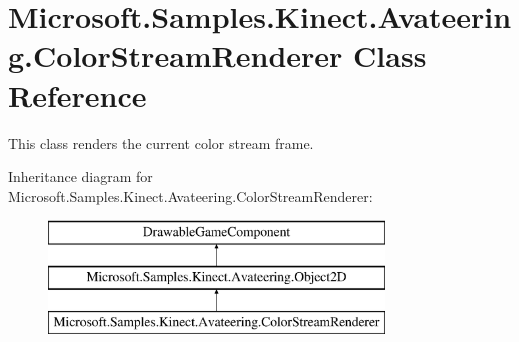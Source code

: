 \hypertarget{class_microsoft_1_1_samples_1_1_kinect_1_1_avateering_1_1_color_stream_renderer}{\section{Microsoft.\+Samples.\+Kinect.\+Avateering.\+Color\+Stream\+Renderer Class Reference}
\label{class_microsoft_1_1_samples_1_1_kinect_1_1_avateering_1_1_color_stream_renderer}
}


This class renders the current color stream frame.  


Inheritance diagram for Microsoft.\+Samples.\+Kinect.\+Avateering.\+Color\+Stream\+Renderer\+:\begin{figure}[H]
\begin{center}
\leavevmode
\includegraphics[height=3.000000cm]{class_microsoft_1_1_samples_1_1_kinect_1_1_avateering_1_1_color_stream_renderer}
\end{center}
\end{figure}
